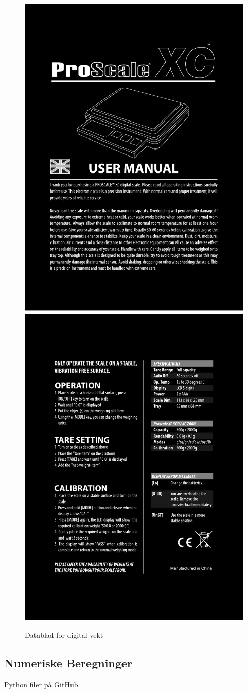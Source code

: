 \documentclass[reprint,norsk,notitlepage]{revtex4-2}
\begin{document}
\begin{figure}[!ht]
  \centering
  \includegraphics[width = .49\textwidth]{fig/proscalexc.pdf}
  \includegraphics[width = .49\textwidth]{fig/proscalexc2.pdf}
  \caption{Datablad for digital vekt}
  \label{fig: datalad digital vekt}
\end{figure}

\newpage 
\subsection{Numeriske Beregninger}
\href{https://github.com/Oskar-Idland/FYS2150-Eksperimental-Fysikk/tree/Finished-Report-1/1%20Lab%20Raport}{Python filer på GitHub}
\end{document}
